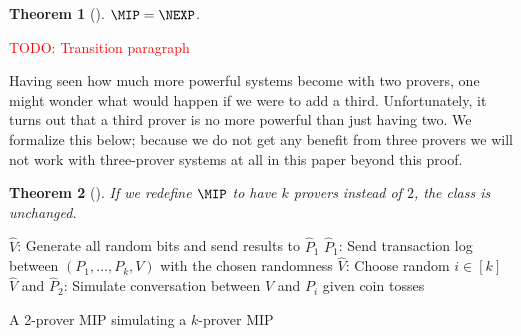 \documentclass[english,12pt]{reedthesis}
\theoremstyle{plain}
\newtheorem{thm}{Theorem}[section]
\theoremstyle{definition}
\theoremstyle{remark}
\newcommand{\TODO}[1]{\textcolor{red}{TODO: #1}}
\begin{document}
\begin{thm}[{\cite{BFL90}}]\label{thm:mip-is-nexp}
  $\MIP = \NEXP$.
\end{thm}

\TODO{Transition paragraph}

Having seen how much more powerful systems become with two provers, one might
wonder what would happen if we were to add a third. Unfortunately, it turns out
that a third prover is no more powerful than just having two. We formalize this
below; because we do not get any benefit from three provers we will not work
with three-prover systems at all in this paper beyond this proof.

\begin{thm}[{\cite[Theorem 4]{BGKW88}}]\label{thm:mip-unchanged}
  If we redefine $\MIP$ to have $k$ provers instead of $2$, the class is unchanged.
\end{thm}

\begin{algorithm}[htbp]
  $\hat{V}$: Generate all random bits and send results to $\hat{P}_{1}$\;
  $\hat{P}_{1}$: Send transaction log between $(P_{1}, \ldots, P_{k}, V)$ with the
  chosen randomness\;
  $\hat{V}$: Choose random $i \in [k]$\;
  $\hat{V}$ and $\hat{P}_{2}$: Simulate conversation between $V$ and $P_{i}$
  given coin tosses\;
  \caption{A 2-prover MIP simulating a $k$-prover MIP}\label{alg:2-prover-sim-k}
\end{algorithm}
\end{document}
